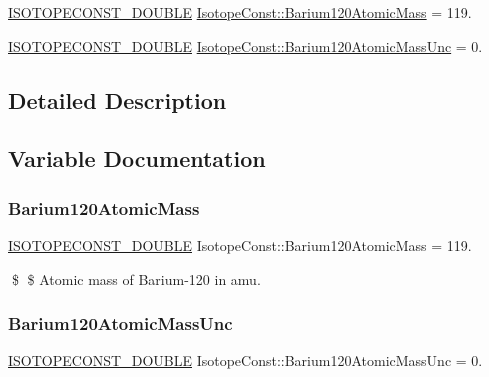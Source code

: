 \begin{DoxyCompactItemize}
\item 
\mbox{\hyperlink{group___isotope_const-_macros_ga8f45a7272ce02c0b4c65c44636ed719a}{I\+S\+O\+T\+O\+P\+E\+C\+O\+N\+S\+T\+\_\+\+D\+O\+U\+B\+LE}} \mbox{\hyperlink{group___isotope_const-_barium-_ba120_ga163bb4237d7db4b0cd7e66a34b320172}{Isotope\+Const\+::\+Barium120\+Atomic\+Mass}} = 119.
\item 
\mbox{\hyperlink{group___isotope_const-_macros_ga8f45a7272ce02c0b4c65c44636ed719a}{I\+S\+O\+T\+O\+P\+E\+C\+O\+N\+S\+T\+\_\+\+D\+O\+U\+B\+LE}} \mbox{\hyperlink{group___isotope_const-_barium-_ba120_gafb52b399021f89f73c183a7527bfae31}{Isotope\+Const\+::\+Barium120\+Atomic\+Mass\+Unc}} = 0.
\end{DoxyCompactItemize}


\subsection{Detailed Description}


\subsection{Variable Documentation}
\mbox{\label{group___isotope_const-_barium-_ba120_ga163bb4237d7db4b0cd7e66a34b320172}} 
\subsubsection{\texorpdfstring{Barium120\+Atomic\+Mass}{Barium120AtomicMass}}
{\footnotesize\ttfamily \mbox{\hyperlink{group___isotope_const-_macros_ga8f45a7272ce02c0b4c65c44636ed719a}{I\+S\+O\+T\+O\+P\+E\+C\+O\+N\+S\+T\+\_\+\+D\+O\+U\+B\+LE}} Isotope\+Const\+::\+Barium120\+Atomic\+Mass = 119.}

\$ \$ Atomic mass of Barium-\/120 in amu. \mbox{\label{group___isotope_const-_barium-_ba120_gafb52b399021f89f73c183a7527bfae31}} 
\subsubsection{\texorpdfstring{Barium120\+Atomic\+Mass\+Unc}{Barium120AtomicMassUnc}}
{\footnotesize\ttfamily \mbox{\hyperlink{group___isotope_const-_macros_ga8f45a7272ce02c0b4c65c44636ed719a}{I\+S\+O\+T\+O\+P\+E\+C\+O\+N\+S\+T\+\_\+\+D\+O\+U\+B\+LE}} Isotope\+Const\+::\+Barium120\+Atomic\+Mass\+Unc = 0.}


